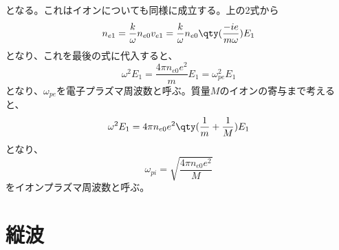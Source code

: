 となる。これはイオンについても同様に成立する。上の2式から
\begin{equation}
	n_{e1} = \frac{k}{\omega}n_{e0}v_{e1} = \frac{k}{\omega}n_{e0}\qty(\frac{-ie}{m\omega})E_1
\end{equation}
となり、これを最後の式に代入すると、
\begin{equation}
	\omega^2 E_1 = \frac{4\pi{}n_{e0}e^2}{m}E_1 = \omega^2_{pe}E_1
\end{equation}
となり、$\omega_{pe}$を電子プラズマ周波数と呼ぶ。質量$M$のイオンの寄与まで考えると、
\begin{equation}
	\omega^2E_1 =  4\pi{}n_{e0}e^2\qty(\frac{1}{m} + \frac{1}{M})E_1
\end{equation}
となり、
\begin{equation}
	\omega_{pi} = \sqrt{\frac{4\pi{}n_{e0}e^2}{M}}
\end{equation}
をイオンプラズマ周波数と呼ぶ。

\newpage
\section{縦波}

